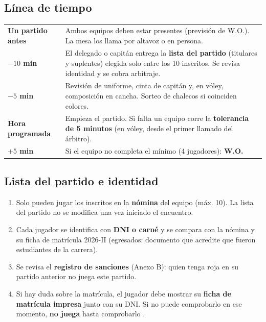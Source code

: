 \subsection{Línea de tiempo}
\renewcommand{\arraystretch}{1.3}
\noindent\begin{tabularx}{\linewidth}{>{\bfseries}p{2.2cm} >{\RaggedRight\arraybackslash}X}
	Un partido antes & Ambos equipos deben estar presentes (previsión de W.O.). La mesa los llama por altavoz o en persona.\\
	$-10$ min & El delegado o capitán entrega la \textbf{lista del partido} (titulares y suplentes) elegida solo entre los 10 inscritos. Se revisa identidad y se cobra arbitraje.\\
	$-5$ min & Revisión de uniforme, cinta de capitán y, en vóley, composición en cancha. Sorteo de chalecos si coinciden colores.\\
	Hora programada & Empieza el partido. Si falta un equipo corre la \textbf{tolerancia de 5 minutos} (en vóley, desde el primer llamado del árbitro).\\
	$+5$ min & Si el equipo no completa el mínimo (4 jugadores): \textbf{W.O.}\\
\end{tabularx}

\subsection{Lista del partido e identidad}
\begin{enumerate}
	\item Solo pueden jugar los inscritos en la \textbf{nómina} del equipo (máx. 10). La lista del partido no se modifica una vez iniciado el encuentro.
	\item Cada jugador se identifica con \textbf{DNI o carné} y se compara con la nómina y su ficha de matrícula 2026-II (egresados: documento que acredite que fueron estudiantes de la carrera).
	\item Se revisa el \textbf{registro de sanciones} (Anexo B): quien tenga roja en su partido anterior no juega este partido.
	\item Si hay duda sobre la matrícula, el jugador debe mostrar su \textbf{ficha de matrícula impresa} junto con su DNI. Si no puede comprobarlo en ese momento, \textbf{no juega} hasta comprobarlo .
\end{enumerate}

